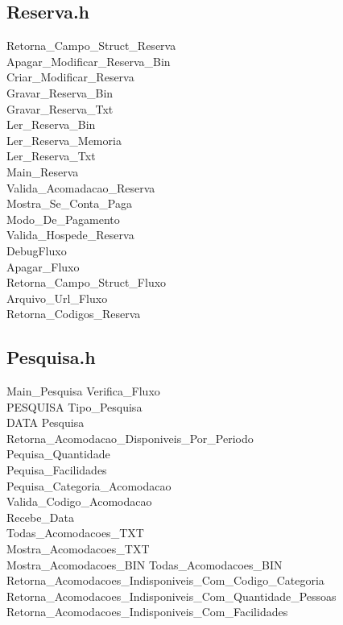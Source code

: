 \documentclass[titlepage]{article}
\begin{document}
	\subsection{Reserva.h}
	Retorna\_Campo\_Struct\_Reserva\\
	Apagar\_Modificar\_Reserva\_Bin\\
	Criar\_Modificar\_Reserva\\
	Gravar\_Reserva\_Bin\\
	Gravar\_Reserva\_Txt\\
	Ler\_Reserva\_Bin\\
	Ler\_Reserva\_Memoria\\
	Ler\_Reserva\_Txt\\
	Main\_Reserva\\
	Valida\_Acomadacao\_Reserva\\
	Mostra\_Se\_Conta\_Paga\\
	Modo\_De\_Pagamento\\
	Valida\_Hospede\_Reserva\\
	DebugFluxo\\
	Apagar\_Fluxo\\
	Retorna\_Campo\_Struct\_Fluxo\\
	Arquivo\_Url\_Fluxo\\
	Retorna\_Codigos\_Reserva	
	
	\subsection{Pesquisa.h}
	Main\_Pesquisa	
	Verifica\_Fluxo\\
	PESQUISA Tipo\_Pesquisa\\
	DATA Pesquisa\\
	Retorna\_Acomodacao\_Disponiveis\_Por\_Periodo\\
	Pequisa\_Quantidade\\
	Pequisa\_Facilidades\\
	Pequisa\_Categoria\_Acomodacao\\
	Valida\_Codigo\_Acomodacao\\
	Recebe\_Data\\
	Todas\_Acomodacoes\_TXT\\
	Mostra\_Acomodacoes\_TXT\\
	Mostra\_Acomodacoes\_BIN	
	Todas\_Acomodacoes\_BIN	
	Retorna\_Acomodacoes\_Indisponiveis\_Com\_Codigo\_Categoria	
	Retorna\_Acomodacoes\_Indisponiveis\_Com\_Quantidade\_Pessoas\\
	Retorna\_Acomodacoes\_Indisponiveis\_Com\_Facilidades\\
	
\end{document}
